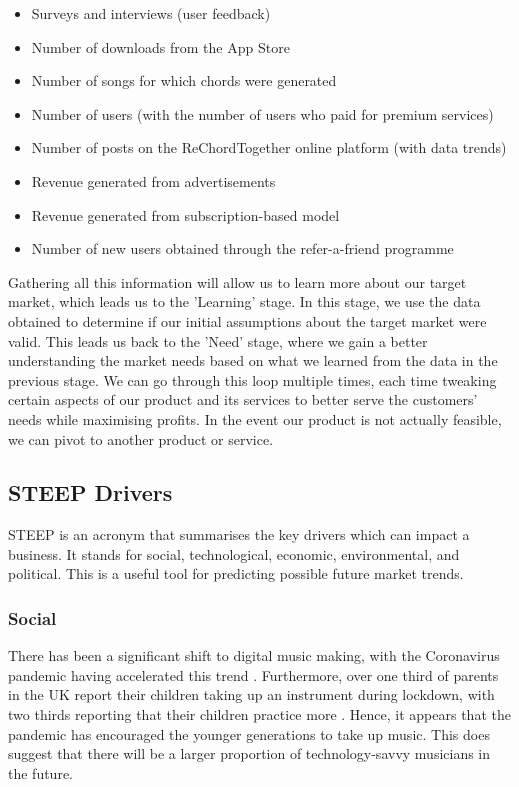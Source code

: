 \begin{itemize}
    \item Surveys and interviews (user feedback)
    \item Number of downloads from the App Store
    \item Number of songs for which chords were generated
    \item Number of users (with the number of users who paid for premium services)
    \item Number of posts on the ReChordTogether online platform (with data trends)
    \item Revenue generated from advertisements
    \item Revenue generated from subscription-based model
    \item Number of new users obtained through the refer-a-friend programme
  \end{itemize}

  Gathering all this information will allow us to learn more about our target market, which leads us to the 'Learning' stage. In this stage, we use the data obtained to determine if our initial assumptions about the target market were valid. This leads us back to the 'Need' stage, where we gain a better understanding the market needs based on what we learned from the data in the previous stage. We can go through this loop multiple times, each time tweaking certain aspects of our product and its services to better serve the customers' needs while maximising profits. In the event our product is not actually feasible, we can pivot to another product or service.

  \subsection{STEEP Drivers}

  STEEP is an acronym that summarises the key drivers which can impact a business. It stands for social, technological, economic, environmental, and political. This is a useful tool for predicting possible future market trends.

  \subsubsection{Social}
  There has been a significant shift to digital music making, with the Coronavirus pandemic having accelerated this trend \cite{abrsm2021}. Furthermore, over one third of parents in the UK report their children taking up an instrument during lockdown, with two thirds reporting that their children practice more \cite{abrsm2021}. Hence, it appears that the pandemic has encouraged the younger generations to take up music. This does suggest that there will be a larger proportion of technology-savvy musicians in the future.

